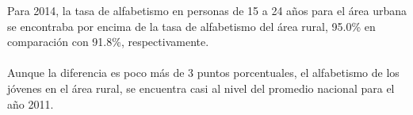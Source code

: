 Para 2014, la tasa de alfabetismo en personas de 15 a 24 años para el área urbana se encontraba por encima de la tasa de alfabetismo del área rural, 95.0\% en comparación con 91.8\%, respectivamente. \\\\ 
Aunque la diferencia es poco más de 3 puntos porcentuales, el alfabetismo de los jóvenes en el área rural, se encuentra casi al nivel del promedio nacional para el año 2011.    